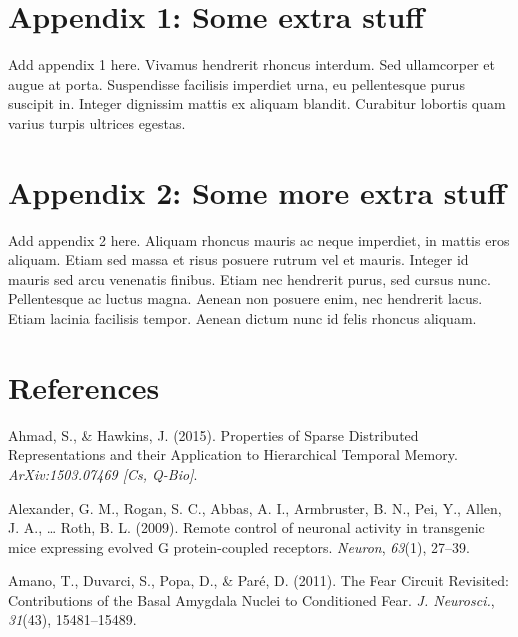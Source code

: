 \documentclass[12pt,a4paper,]{report}
\begin{document}
\chapter*{Appendix 1: Some extra
stuff}\label{appendix-1-some-extra-stuff}

Add appendix 1 here. Vivamus hendrerit rhoncus interdum. Sed ullamcorper
et augue at porta. Suspendisse facilisis imperdiet urna, eu pellentesque
purus suscipit in. Integer dignissim mattis ex aliquam blandit.
Curabitur lobortis quam varius turpis ultrices egestas.

\chapter*{Appendix 2: Some more extra
stuff}\label{appendix-2-some-more-extra-stuff}

Add appendix 2 here. Aliquam rhoncus mauris ac neque imperdiet, in
mattis eros aliquam. Etiam sed massa et risus posuere rutrum vel et
mauris. Integer id mauris sed arcu venenatis finibus. Etiam nec
hendrerit purus, sed cursus nunc. Pellentesque ac luctus magna. Aenean
non posuere enim, nec hendrerit lacus. Etiam lacinia facilisis tempor.
Aenean dictum nunc id felis rhoncus aliquam.

\footnotesize

\chapter*{References}\label{references-1}

\hypertarget{refs}{}
\hypertarget{ref-ahmadux5fpropertiesux5f2015}{}
Ahmad, S., \& Hawkins, J. (2015). Properties of Sparse Distributed
Representations and their Application to Hierarchical Temporal Memory.
\emph{ArXiv:1503.07469 {[}Cs, Q-Bio{]}}.

\hypertarget{ref-alexanderux5fremoteux5f2009}{}
Alexander, G. M., Rogan, S. C., Abbas, A. I., Armbruster, B. N., Pei,
Y., Allen, J. A., \ldots{} Roth, B. L. (2009). Remote control of
neuronal activity in transgenic mice expressing evolved G
protein-coupled receptors. \emph{Neuron}, \emph{63}(1), 27--39.

\hypertarget{ref-amanoux5ffearux5f2011-1}{}
Amano, T., Duvarci, S., Popa, D., \& Paré, D. (2011). The Fear Circuit
Revisited: Contributions of the Basal Amygdala Nuclei to Conditioned
Fear. \emph{J. Neurosci.}, \emph{31}(43), 15481--15489.
\end{document}
